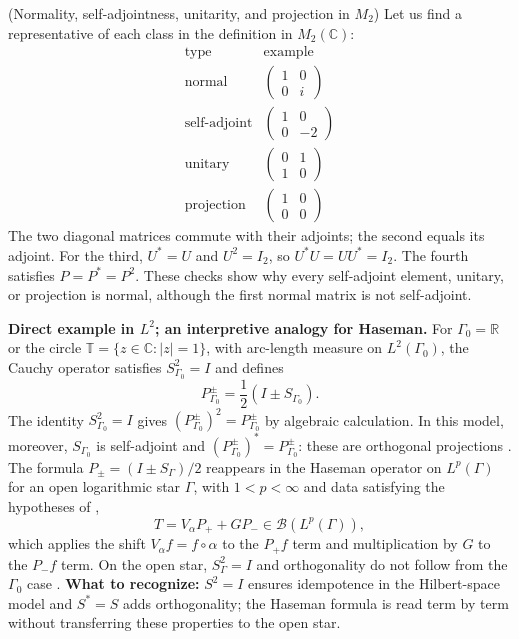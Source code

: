 \begin{cthejemplo}{(Normality, self-adjointness, unitarity, and projection in $M_2$)}
Let us find a representative of each class in the definition in
$M_2(\mathbb C)$:
\[
\begin{array}{c|c}
\text{type}&\text{example}\\ \hline
\text{normal}&\begin{pmatrix}1&0\\0&i\end{pmatrix}\\[2mm]
\text{self-adjoint}&\begin{pmatrix}1&0\\0&-2\end{pmatrix}\\[2mm]
\text{unitary}&\begin{pmatrix}0&1\\1&0\end{pmatrix}\\[2mm]
\text{projection}&\begin{pmatrix}1&0\\0&0\end{pmatrix}
\end{array}
\]
The two diagonal matrices commute with their adjoints; the second
equals its adjoint. For the third, $U^*=U$ and $U^2=I_2$,
so $U^*U=UU^*=I_2$. The fourth satisfies
$P=P^*=P^2$. These checks show why every
self-adjoint element, unitary, or projection is normal, although the first
normal matrix is not self-adjoint.
\end{cthejemplo}

\begin{investigacion}
\textbf{Direct example in $L^2$; an interpretive analogy for Haseman.}
For $\Gamma_0=\mathbb R$ or the circle
$\mathbb T=\{z\in\mathbb C:|z|=1\}$, with arc-length measure on $L^2(\Gamma_0)$,
the Cauchy operator satisfies $S_{\Gamma_0}^2=I$ and defines
\[
 P_{\Gamma_0}^\pm=\frac12(I\pm S_{\Gamma_0}).
\]
The identity $S_{\Gamma_0}^2=I$ gives $(P_{\Gamma_0}^\pm)^2=P_{\Gamma_0}^\pm$ by
algebraic calculation. In this model, moreover, $S_{\Gamma_0}$ is self-adjoint and
$(P_{\Gamma_0}^\pm)^*=P_{\Gamma_0}^\pm$: these are orthogonal projections
\cite[Sec.~2, p.~22]{BFK2006}. The formula
$P_\pm=(I\pm S_\Gamma)/2$ reappears in the Haseman operator on
$L^p(\Gamma)$ for an open logarithmic star $\Gamma$, with
$1<p<\infty$ and data satisfying the hypotheses of \cite{Karlovich2017},
\[
 T=V_\alpha P_+ + GP_-\in\mathcal B(L^p(\Gamma)),
\]
which applies the shift $V_\alpha f=f\circ\alpha$ to the $P_+f$ term and
multiplication by $G$ to the $P_-f$ term. On the open star,
$S_\Gamma^2=I$ and orthogonality do not follow from the $\Gamma_0$ case
\cite[(1.2)]{Karlovich2017}.
\textbf{What to recognize:} $S^2=I$ ensures idempotence in the Hilbert-space
model and $S^*=S$ adds orthogonality; the Haseman formula is read term by
term without transferring these properties to the open star.
\end{investigacion}

